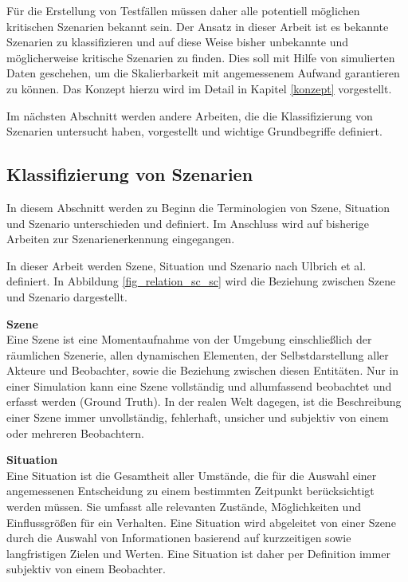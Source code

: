 Für die Erstellung von Testfällen müssen daher alle potentiell möglichen kritischen Szenarien bekannt sein. Der Ansatz in dieser Arbeit ist es bekannte Szenarien zu klassifizieren und auf diese Weise bisher unbekannte und möglicherweise kritische Szenarien zu finden. Dies soll mit Hilfe von simulierten Daten geschehen, um die Skalierbarkeit mit angemessenem Aufwand garantieren zu können. Das Konzept hierzu wird im Detail in Kapitel \ref{konzept} vorgestellt.

 Im nächsten Abschnitt werden andere Arbeiten, die die Klassifizierung von Szenarien untersucht haben, vorgestellt und wichtige Grundbegriffe definiert.


\subsection{Klassifizierung von Szenarien}
\label{grundlagen_fahren_szenarien}

In diesem Abschnitt werden zu Beginn die Terminologien von Szene, Situation und Szenario unterschieden und definiert. Im Anschluss wird auf bisherige Arbeiten zur Szenarienerkennung eingegangen.

In dieser Arbeit werden Szene, Situation und Szenario nach Ulbrich et al. \cite{ulbrich2015defining} definiert. In Abbildung \ref{fig_relation_sc_sc} wird die Beziehung zwischen Szene und Szenario dargestellt.

\noindent\textbf{Szene}\\
Eine Szene ist eine Momentaufnahme von der Umgebung einschließlich der räumlichen Szenerie,  allen dynamischen Elementen, der Selbstdarstellung aller Akteure und Beobachter, sowie die Beziehung zwischen diesen Entitäten. Nur in einer Simulation kann eine Szene vollständig und allumfassend beobachtet und erfasst werden (Ground Truth). In der realen Welt dagegen, ist die Beschreibung einer Szene immer unvollständig, fehlerhaft, unsicher und subjektiv von einem oder mehreren Beobachtern.

\noindent\textbf{Situation}\\
Eine Situation ist die Gesamtheit aller Umstände, die für die Auswahl einer angemessenen Entscheidung zu einem bestimmten Zeitpunkt berücksichtigt werden müssen. Sie umfasst alle relevanten Zustände, Möglichkeiten und Einflussgrößen für ein Verhalten. Eine Situation wird abgeleitet von einer Szene durch die Auswahl von Informationen basierend auf kurzzeitigen sowie langfristigen Zielen und Werten. Eine Situation ist daher per Definition immer subjektiv von einem Beobachter.

